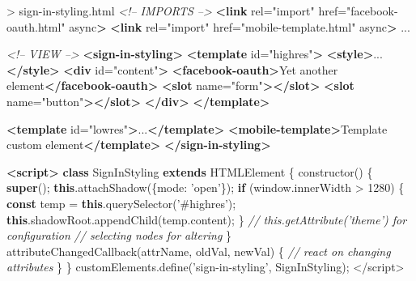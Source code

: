 \documentclass[]{article}
\newenvironment{Shaded}{}{}
\newcommand{\KeywordTok}[1]{\textcolor[rgb]{0.00,0.44,0.13}{\textbf{{#1}}}}
\newcommand{\DataTypeTok}[1]{\textcolor[rgb]{0.56,0.13,0.00}{{#1}}}
\newcommand{\DecValTok}[1]{\textcolor[rgb]{0.25,0.63,0.44}{{#1}}}
\newcommand{\FloatTok}[1]{\textcolor[rgb]{0.25,0.63,0.44}{{#1}}}
\newcommand{\StringTok}[1]{\textcolor[rgb]{0.25,0.44,0.63}{{#1}}}
\newcommand{\SpecialStringTok}[1]{\textcolor[rgb]{0.73,0.40,0.53}{{#1}}}
\newcommand{\CommentTok}[1]{\textcolor[rgb]{0.38,0.63,0.69}{\textit{{#1}}}}
\newcommand{\OtherTok}[1]{\textcolor[rgb]{0.00,0.44,0.13}{{#1}}}
\newcommand{\VariableTok}[1]{\textcolor[rgb]{0.10,0.09,0.49}{{#1}}}
\newcommand{\ControlFlowTok}[1]{\textcolor[rgb]{0.00,0.44,0.13}{\textbf{{#1}}}}
\newcommand{\OperatorTok}[1]{\textcolor[rgb]{0.40,0.40,0.40}{{#1}}}
\newcommand{\AttributeTok}[1]{\textcolor[rgb]{0.49,0.56,0.16}{{#1}}}
\newcommand{\NormalTok}[1]{{#1}}
\begin{document}
\begin{Shaded}
\begin{Highlighting}[]
\NormalTok{> sign-in-styling.html}
\CommentTok{<!-- IMPORTS -->}
\KeywordTok{<link}\OtherTok{ rel=}\StringTok{"import"}\OtherTok{ href=}\StringTok{"facebook-oauth.html"}\OtherTok{ async}\KeywordTok{>}
\KeywordTok{<link}\OtherTok{ rel=}\StringTok{"import"}\OtherTok{ href=}\StringTok{"mobile-template.html"}\OtherTok{ async}\KeywordTok{>}
\NormalTok{...}

\CommentTok{<!-- VIEW -->}
\KeywordTok{<sign-in-styling>}
  \KeywordTok{<template}\OtherTok{ id=}\StringTok{"highres"}\KeywordTok{>}
    \KeywordTok{<style>}\FloatTok{...}\KeywordTok{</style>}
    \KeywordTok{<div}\OtherTok{ id=}\StringTok{"content"}\KeywordTok{>}
      \KeywordTok{<facebook-oauth>}\NormalTok{Yet another element}\KeywordTok{</facebook-oauth>}
      \KeywordTok{<slot}\OtherTok{ name=}\StringTok{"form"}\KeywordTok{></slot>}
      \KeywordTok{<slot}\OtherTok{ name=}\StringTok{"button"}\KeywordTok{></slot>}
    \KeywordTok{</div>}
  \KeywordTok{</template>}
  
  \KeywordTok{<template}\OtherTok{ id=}\StringTok{"lowres"}\KeywordTok{>}\NormalTok{...}\KeywordTok{</template>}
  \KeywordTok{<mobile-template>}\NormalTok{Template custom element}\KeywordTok{</template>}
\KeywordTok{</sign-in-styling>}

\KeywordTok{<script>}
  \KeywordTok{class} \NormalTok{SignInStyling }\KeywordTok{extends} \NormalTok{HTMLElement }\OperatorTok{\{}
    \AttributeTok{constructor}\NormalTok{() }\OperatorTok{\{}
      \KeywordTok{super}\NormalTok{()}\OperatorTok{;}
      \KeywordTok{this}\NormalTok{.}\AttributeTok{attachShadow}\NormalTok{(}\OperatorTok{\{}\DataTypeTok{mode}\OperatorTok{:} \StringTok{'open'}\OperatorTok{\}}\NormalTok{)}\OperatorTok{;}
      \ControlFlowTok{if} \NormalTok{(}\VariableTok{window}\NormalTok{.}\AttributeTok{innerWidth} \OperatorTok{>} \DecValTok{1280}\NormalTok{) }\OperatorTok{\{}
        \KeywordTok{const} \NormalTok{temp }\OperatorTok{=} \KeywordTok{this}\NormalTok{.}\AttributeTok{querySelector}\NormalTok{(}\StringTok{'#highres'}\NormalTok{)}\OperatorTok{;}
        \KeywordTok{this}\NormalTok{.}\VariableTok{shadowRoot}\NormalTok{.}\AttributeTok{appendChild}\NormalTok{(}\VariableTok{temp}\NormalTok{.}\AttributeTok{content}\NormalTok{)}\OperatorTok{;}
      \OperatorTok{\}}  
      \CommentTok{// this.getAttribute('theme') for configuration}
      \CommentTok{// selecting nodes for altering}
    \OperatorTok{\}}
    \AttributeTok{attributeChangedCallback}\NormalTok{(attrName}\OperatorTok{,} \NormalTok{oldVal}\OperatorTok{,} \NormalTok{newVal) }\OperatorTok{\{}
      \CommentTok{// react on changing attributes}
    \OperatorTok{\}}
  \OperatorTok{\}}
  \VariableTok{customElements}\NormalTok{.}\AttributeTok{define}\NormalTok{(}\StringTok{'sign-in-styling'}\OperatorTok{,} \NormalTok{SignInStyling)}\OperatorTok{;}
\OperatorTok{<}\SpecialStringTok{/script>}
\end{Highlighting}
\end{Shaded}
\end{document}
